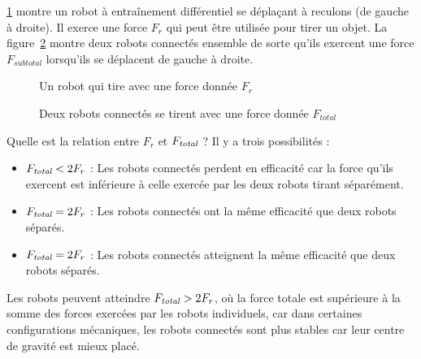 \ref{fig.pulling1} montre un robot à entraînement différentiel se déplaçant à reculons (de gauche à droite). Il exerce une force $F_r$ qui peut être utilisée pour tirer un objet. La figure~\ref{fig.pulling2} montre deux robots connectés ensemble de sorte qu'ils exercent une force $F_{sub{total}}$ lorsqu'ils se déplacent de gauche à droite.

\begin{figure}
\begin{center}
\caption{Un robot qui tire avec une force donnée $F_r$}\label{fig.pulling1}
\end{center}
\end{figure}

\begin{figure}
\begin{center}
\caption{Deux robots connectés se tirent avec une force donnée $F_{total}$}\label{fig.pulling2}
\end{center}
\end{figure}

Quelle est la relation entre $F_r$ et $F_{\textit{\scriptsize total}}$ ? Il y a trois possibilités :
\begin{itemize}
\item $F_{\textit{\scriptsize total}} < 2 F_r$ : Les robots connectés perdent en efficacité car la force qu'ils exercent est inférieure à celle exercée par les deux robots tirant séparément.
\item $F_{\textit{\scriptsize total}} = 2 F_r$ : Les robots connectés ont la même efficacité que deux robots séparés.
\item $F_{\textit{\scriptsize total}} = 2 F_r$ : Les robots connectés atteignent la même efficacité que deux robots séparés.
\end{itemize}
Les robots peuvent atteindre $F_{\textit{\scriptsize total}} > 2 F_r$, où la force totale est supérieure à la somme des forces exercées par les robots individuels, car dans certaines configurations mécaniques, les robots connectés sont plus stables car leur centre de gravité est mieux placé. 

